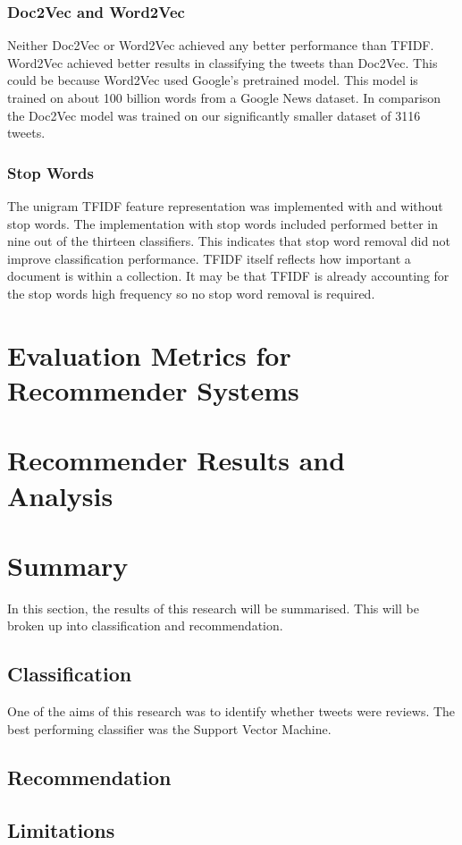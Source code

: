 \subsubsection*{Doc2Vec and Word2Vec}

Neither Doc2Vec or Word2Vec achieved any better performance than TFIDF. Word2Vec achieved better results in classifying the tweets than Doc2Vec. This could be because Word2Vec used Google's pretrained model. This model is trained on about 100 billion words from a Google News dataset. In comparison the Doc2Vec model was trained on our significantly smaller dataset of 3116 tweets.

\subsubsection*{Stop Words}

The unigram TFIDF feature representation was implemented with and without stop words. The implementation with stop words included performed better in nine out of the thirteen classifiers. This indicates that stop word removal did not improve classification performance. TFIDF itself reflects how important a document is within a collection. It may be that TFIDF is already accounting for the stop words high frequency so no stop word removal is required.


\section{Evaluation Metrics for Recommender Systems}

\section{Recommender Results and Analysis}

\section{Summary}

In this section, the results of this research will be summarised. This will be broken up into classification and recommendation.

\subsection*{Classification}

One of the aims of this research was to identify whether tweets were reviews. 
The best performing classifier was the Support Vector Machine.

\subsection*{Recommendation}

\subsection*{Limitations}
